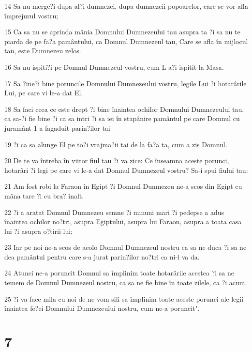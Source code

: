 \par 14 Sa nu merge?i dupa al?i dumnezei, dupa dumnezeii popoarelor, care se vor afla împrejurul vostru;
\par 15 Ca sa nu se aprinda mânia Domnului Dumnezeului tau asupra ta ?i sa nu te piarda de pe fa?a pamântului, ca Domnul Dumnezeul tau, Care se afla în mijlocul tau, este Dumnezeu zelos.
\par 16 Sa nu ispiti?i pe Domnul Dumnezeul vostru, cum L-a?i ispitit la Masa.
\par 17 Sa ?ine?i bine poruncile Domnului Dumnezeului vostru, legile Lui ?i hotarârile Lui, pe care vi le-a dat El.
\par 18 Sa faci ceea ce este drept ?i bine înaintea ochilor Domnului Dumnezeului tau, ca sa-?i fie bine ?i ca sa intri ?i sa iei în stapânire pamântul pe care Domnul cu juramânt 1-a fagaduit parin?ilor tai
\par 19 ?i ca sa alunge El pe to?i vrajma?ii tai de la fa?a ta, cum a zis Domnul.
\par 20 De te va întreba în viitor fiul tau ?i va zice: Ce înseamna aceste porunci, hotarâri ?i legi pe care vi le-a dat Domnul Dumnezeul vostru? Sa-i spui fiului tau:
\par 21 Am fost robi la Faraon în Egipt ?i Domnul Dumnezeu ne-a scos din Egipt cu mâna tare ?i cu bra? înalt.
\par 22 ?i a aratat Domnul Dumnezeu semne ?i minuni mari ?i pedepse a adus înaintea ochilor no?tri, asupra Egiptului, asupra lui Faraon, asupra a toata casa lui ?i asupra o?tirii lui;
\par 23 Iar pe noi ne-a scos de acolo Domnul Dumnezeul nostru ca sa ne duca ?i sa ne dea pamântul pentru care s-a jurat parin?ilor no?tri ca ni-l va da.
\par 24 Atunci ne-a poruncit Domnul sa împlinim toate hotarârile acestea ?i sa ne temem de Domnul Dumnezeul nostru, ca sa ne fie bine în toate zilele, ca ?i acum.
\par 25 ?i va face mila cu noi de ne vom sili sa împlinim toate aceste porunci ale legii înaintea fe?ei Domnului Dumnezeului nostru, cum ne-a poruncit".

\chapter{7}

